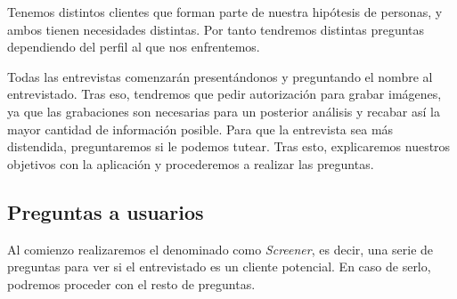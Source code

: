 Tenemos distintos clientes que forman parte de nuestra hipótesis de personas, y ambos tienen necesidades distintas. Por tanto tendremos distintas preguntas
dependiendo del perfil al que nos enfrentemos.

Todas las entrevistas comenzarán presentándonos y preguntando el nombre al entrevistado. Tras eso, tendremos que pedir autorización para grabar imágenes, ya que las
grabaciones son necesarias para un posterior análisis y recabar así la mayor cantidad de información posible. Para que la entrevista sea más distendida, preguntaremos
si le podemos tutear. Tras esto, explicaremos nuestros objetivos con la aplicación y procederemos a realizar las preguntas.

\subsection{Preguntas a usuarios}

Al comienzo realizaremos el denominado como \textit{Screener}, es decir, una serie de preguntas para ver si el entrevistado es un cliente potencial. En caso de serlo,
podremos proceder con el resto de preguntas.

